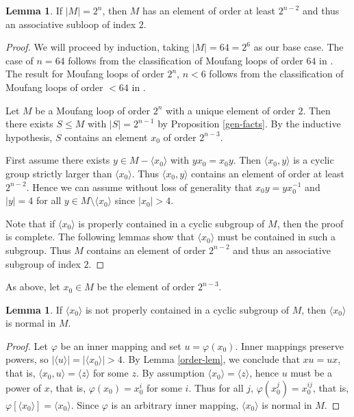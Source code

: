 \documentclass[12pt, twoside, openright]{report}
\theoremstyle{definition}
\newtheorem{lem}[thm]{Lemma}
\begin{document}
\begin{lem}\label{index2subloop}
	If $|M| = 2^n$, then $M$ has an element of order at least $2^{n - 2}$ and thus an associative subloop of index $2$.
\end{lem}

\begin{proof}
  We will proceed by induction, taking $|M| = 64 = 2^6$ as our base case. The case of $n = 64$ follows from the
    classification of Moufang loops of order $64$ in \cite{64and81}. The result for Moufang loops of order
    $2^n$, $n < 6$ follows from the classification of Moufang loops of order $< 64$ in \cite{Chein} \cite{Goodaire}.

  Let $M$ be a Moufang loop of order $2^n$ with a unique element of order $2$. Then there exists $S\leq M$
    with $|S| = 2^{n - 1}$ by Proposition \ref{gen-facts}. By the inductive hypothesis, $S$ contains an
    element $x_0$ of order $2^{n - 3}$.

	First assume there exists $y\in M- \langle x_0 \rangle$ with $yx_0 = x_0 y$. Then $\langle x_0, y\rangle$
    is a cyclic group strictly larger than $\langle x_0\rangle$. Thus $\langle x_0, y\rangle$ contains an
    element of order at least $2^{n - 2}$. Hence we can assume without loss of generality that
    $x_0 y = yx_0^{-1}$ and $|y| = 4$ for all $y\in M\setminus \langle x_0 \rangle$ since $|x_0| > 4$.

	Note that if $\langle x_0\rangle$ is properly contained in a cyclic subgroup of $M$, then the proof is
    complete. The following lemmas show that $\langle x_0\rangle$ must be contained in such a subgroup.
    Thus $M$ contains an element of order $2^{n - 2}$ and thus an associative subgroup of index $2$.
\end{proof}

As above, let $x_0\in M$ be the element of order $2^{n - 3}$.

\begin{lem}
	If $\langle x_0\rangle$ is not properly contained in a cyclic subgroup of $M$, then $\langle x_0\rangle$ is normal in $M$.
\end{lem}

\begin{proof}
	Let $\varphi$ be an inner mapping and set $u = \varphi(x_0)$. Inner mappings preserve powers, so
    $|\langle u\rangle| = |\langle x_0\rangle| > 4$. By Lemma \ref{order-lem}, we conclude that $xu = ux$,
    that is, $\langle x_0,u\rangle = \langle z\rangle$ for some $z$. By assumption
    $\langle x_0\rangle = \langle z\rangle$, hence $u$ must be a power of $x$, that is, $\varphi(x_0) = x_0^i$
    for some $i$. Thus for all $j$, $\varphi(x_0^j) = x_0^{ij}$, that is,
    $\varphi[\langle x_0\rangle]= \langle x_0\rangle$. Since $\varphi$ is an arbitrary inner mapping,
    $\langle x_0\rangle$ is normal in $M$.
\end{proof}
\end{document}
